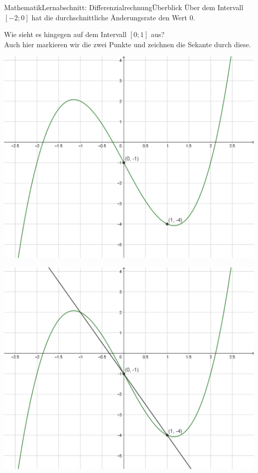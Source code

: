 \documentclass[11pt,twocolumn,oneside,openany,headings=optiontotoc,11pt,numbers=noenddot,final]{article}
\begin{document}
\begin{worksheet}{Mathematik}{Lernabschnitt: Differenzialrechnung}{Überblick}
		Über dem Intervall \([-2;0]\) hat die durchschnittliche Änderungsrate den Wert \(0\).\\
		\par\noindent
		Wie sieht es hingegen auf dem Intervall \([0;1]\) aus?\\
		Auch hier markieren wir die zwei Punkte und zeichnen die Sekante durch diese.\\
		\par\noindent
		\begin{minipage}{0.2\textwidth}
			\includegraphics[width=0.98\textwidth,align=t]{../99_Bilder/04_Skr_DifQuo1.png}
		\end{minipage}
		\hfill
		\begin{minipage}{0.2\textwidth}
			\includegraphics[width=0.98\textwidth,align=t]{../99_Bilder/04_Skr_DifQuo1_G.png}

\end{minipage}
\end{worksheet}
\end{document}
